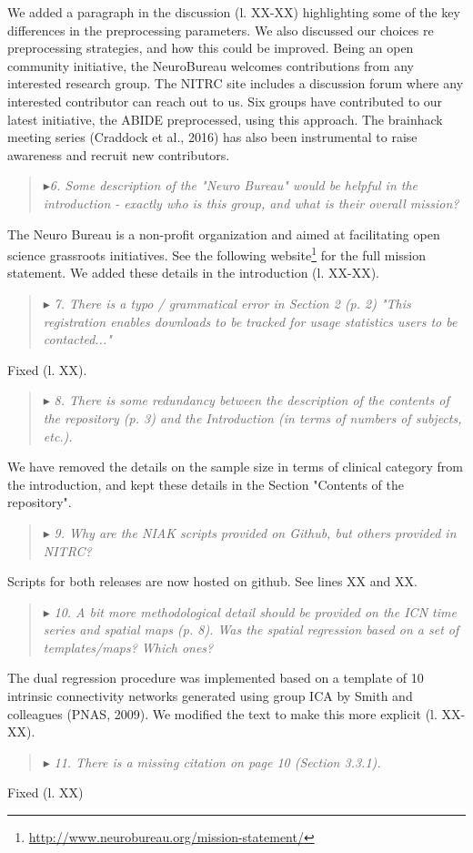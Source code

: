 \documentclass[authoryear,3p]{elsarticle}
\begin{document}
We added a paragraph in the discussion (l. XX-XX) highlighting some of the key differences in the preprocessing parameters. We also discussed our choices re preprocessing strategies, and how this could be improved. Being an open community initiative, the NeuroBureau welcomes contributions from any interested research group. The NITRC site includes a discussion forum where any interested contributor can reach out to us. Six groups have contributed to our latest initiative, the ABIDE preprocessed, using this approach. The brainhack meeting series (Craddock et al., 2016) has also been instrumental to raise awareness and recruit new contributors. 

\begin{quote}
$\blacktriangleright$\emph{6. Some description of the "Neuro Bureau" would be helpful in the introduction - exactly who is this group, and what is their overall mission?
}
\end{quote}

The Neuro Bureau is a non-profit organization and aimed at facilitating open science grassroots initiatives. See the following website\footnote{\url{http://www.neurobureau.org/mission-statement/}} for the full mission statement. We added these details in the introduction (l. XX-XX).  

\begin{quote}
$\blacktriangleright$\emph{ 7. There is a typo / grammatical error in Section 2 (p. 2) "This registration enables downloads to be tracked for usage statistics users to be contacted..."
}
\end{quote}
Fixed (l. XX). 


\begin{quote}
$\blacktriangleright$\emph{ 
8. There is some redundancy between the description of the contents of the repository (p. 3) and the Introduction (in terms of numbers of subjects, etc.).
}
\end{quote}
We have removed the details on the sample size in terms of clinical category from the introduction, and kept these details in the Section "Contents of the repository". 

\begin{quote}
$\blacktriangleright$\emph{ 
9. Why are the NIAK scripts provided on Github, but others provided in NITRC?}
\end{quote}
Scripts for both releases are now hosted on github. See lines XX and XX. 

\begin{quote}
$\blacktriangleright$\emph{ 
10. A bit more methodological detail should be provided on the ICN time series and spatial maps (p. 8).  Was the spatial regression based on a set of templates/maps?  Which ones?}
\end{quote}
The dual regression procedure was implemented based on a template of 10 intrinsic connectivity networks generated using group ICA by Smith and colleagues (PNAS, 2009). We modified the text to make this more explicit (l. XX-XX). 

\begin{quote}
$\blacktriangleright$\emph{ 
11. There is a missing citation on page 10 (Section 3.3.1).
}
\end{quote}

Fixed (l. XX)
\end{document}
